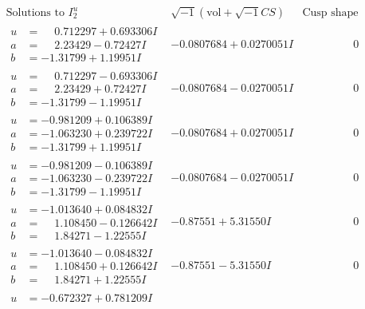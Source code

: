 \documentclass[1p]{elsarticle_modified}
\theoremstyle{definition}
\newcommand{\I}{\sqrt{-1}}
\begin{document}
$$\begin{array}{c|c|c}  
\text{Solutions to }I^u_{2}& \I (\text{vol} + \sqrt{-1}CS) & \text{Cusp shape}\\
 \hline 
\begin{aligned}
u &= \phantom{-}0.712297 + 0.693306 I \\
a &= \phantom{-}2.23429 - 0.72427 I \\
b &= -1.31799 + 1.19951 I\end{aligned}
 & -0.0807684 + 0.0270051 I & \phantom{-0.000000 } 0 \\ \hline\begin{aligned}
u &= \phantom{-}0.712297 - 0.693306 I \\
a &= \phantom{-}2.23429 + 0.72427 I \\
b &= -1.31799 - 1.19951 I\end{aligned}
 & -0.0807684 - 0.0270051 I & \phantom{-0.000000 } 0 \\ \hline\begin{aligned}
u &= -0.981209 + 0.106389 I \\
a &= -1.063230 + 0.239722 I \\
b &= -1.31799 + 1.19951 I\end{aligned}
 & -0.0807684 + 0.0270051 I & \phantom{-0.000000 } 0 \\ \hline\begin{aligned}
u &= -0.981209 - 0.106389 I \\
a &= -1.063230 - 0.239722 I \\
b &= -1.31799 - 1.19951 I\end{aligned}
 & -0.0807684 - 0.0270051 I & \phantom{-0.000000 } 0 \\ \hline\begin{aligned}
u &= -1.013640 + 0.084832 I \\
a &= \phantom{-}1.108450 - 0.126642 I \\
b &= \phantom{-}1.84271 - 1.22555 I\end{aligned}
 & -0.87551 + 5.31550 I & \phantom{-0.000000 } 0 \\ \hline\begin{aligned}
u &= -1.013640 - 0.084832 I \\
a &= \phantom{-}1.108450 + 0.126642 I \\
b &= \phantom{-}1.84271 + 1.22555 I\end{aligned}
 & -0.87551 - 5.31550 I & \phantom{-0.000000 } 0 \\ \hline\begin{aligned}
u &= -0.672327 + 0.781209 I \\

\end{aligned}
\end{array}$$
\end{document}
